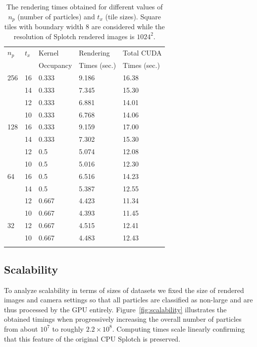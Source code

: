 \documentclass[smallextended]{svjour3}
\begin{document}
\begin{table}
\caption{The rendering times obtained for different values of $n_p$ (number of particles) and $t_x$ (tile sizes). Square tiles with boundary width 8 are considered while the resolution of Splotch rendered images is $1024^{2}.$}
\label{tab:tuning}
\begin{tabular}{lllll}
\hline \noalign{\smallskip}
$n_p$ & $t_x$ & Kernel & Rendering & Total CUDA \\
            & & Occupancy & Times (sec.) & Times (sec.) \\
\noalign{\smallskip} \hline \noalign{\smallskip}
256   & 16 & 0.333 & 9.186 & 16.38 \\
      & 14 & 0.333 & 7.345  & 15.30 \\
      & 12 & 0.333 & 6.881  & 14.01 \\
      & 10 & 0.333 & 6.768 & 14.06 \\
128   & 16 & 0.333 & 9.159 & 17.00 \\
      & 14 & 0.333 & 7.302  & 15.30 \\
      & 12 & 0.5 & 5.074  & 12.08 \\
      & 10 & 0.5 & 5.016 & 12.30 \\ 
64    & 16 & 0.5 & 6.516 & 14.23 \\
      & 14 & 0.5 & 5.387 & 12.55 \\
      & 12 & 0.667 & 4.423 & 11.34 \\
      & 10 & 0.667 & 4.393 & 11.45 \\ 
32    & 12 & 0.667 & 4.515 & 12.41 \\
      & 10 & 0.667 & 4.483 & 12.43 \\ 
\noalign{\smallskip} \hline
\end{tabular}
\end{table}

\subsection{Scalability}
\label{sec:scalability}
To analyze scalability in terms of sizes of datasets we fixed the size of rendered images and camera settings so that all particles are classified as non-large and are thus processed by the GPU entirely. 
Figure~\ref{fig:scalability} illustrates the obtained timings when progressively increasing the overall number of particles
from about $10^7$ to roughly $2.2\times10^8$. Computing times scale linearly confirming that this feature of the original CPU Splotch is preserved. 
\end{document}

